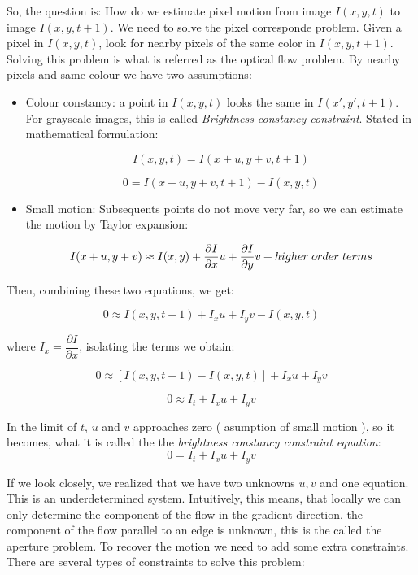 \documentclass[12pt, a4paper, titlepage,twoside,openright]{article}
\begin{document}
So, the question is: How do we estimate pixel motion from image $I(x,y,t)$ to image $I(x,y,t+1)$. We need to solve the pixel corresponde problem. Given a pixel in $I(x,y,t)$, look for nearby pixels of the same color in $I(x,y,t+1)$. Solving this problem is what is referred as the optical flow problem. By nearby pixels and same colour we have two assumptions:

\begin{itemize}

\item Colour constancy: a point in $I(x,y,t)$ looks the same in $I(x',y',t+1)$. For grayscale images, this is called \textit{Brightness constancy constraint}. Stated in mathematical formulation:

$$ I(x,y,t) = I(x+u,y+v,t+1) $$

$$ 0 = I(x+u,y+v,t+1)-I(x,y,t)  $$

\item Small motion: Subsequents points do not move very far, so we can estimate the motion by Taylor expansion: 

$$ I(x+u,y+v) 	\approx  I(x,y) + \dfrac{ \partial I}{\partial x}u +\dfrac{ \partial I}{\partial y}v + higher \hspace{0.1cm} order \hspace{0.1cm} terms $$


\end{itemize}
 
Then, combining these two equations, we get:

$$ 0 	\approx  I(x,y,t+1) + I_{x}u +I_{y}v - I(x,y,t) $$

where $I_{x} =  \dfrac{ \partial I}{\partial x}$, isolating the terms we obtain:

$$ 0 	\approx [I(x,y,t+1) - I(x,y,t)] + I_{x}u +I_{y}v $$

$$ 0 	\approx I_{t} + I_{x}u +I_{y}v $$

In the limit of $t$, $u$ and $v$ approaches zero ( asumption of small motion ), so it becomes, what it is called the the \textit{brightness constancy constraint equation}:
$$ 0 	= I_{t} + I_{x}u +I_{y}v $$

If we look closely, we realized that we have two unknowns $u,v$ and one equation. This is an underdetermined system. Intuitively, this means, that locally we can only determine the component of the flow in the gradient direction, the component of the flow parallel to an edge is unknown, this is the called the aperture problem. To recover the motion we need to add some extra constraints. There are several types of constraints to solve this problem:
\end{document}
